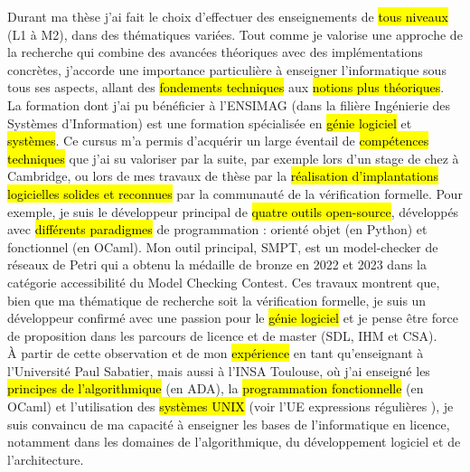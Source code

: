 \label{sec:projet_enseignement}
\vspace{10pt}

Durant ma thèse j'ai fait le choix d'effectuer des enseignements de \hl{tous
niveaux} (L1 à M2), dans des thématiques variées. Tout comme je valorise une
approche de la recherche qui combine des avancées théoriques avec des
implémentations concrètes, j'accorde une importance particulière à enseigner
l'informatique sous tous ses aspects, allant des \hl{fondements techniques} aux
\hl{notions plus théoriques}.\\

La formation dont j'ai pu bénéficier à l'ENSIMAG (dans la filière Ingénierie des
Systèmes d'Information) est une formation spécialisée en \hl{génie logiciel} et
\hl{systèmes}. Ce cursus m'a permis d'acquérir un large éventail de
\hl{compétences techniques} que j'ai su valoriser par la suite, par exemple lors
d'un stage de  chez  à Cambridge,
ou lors de mes travaux de thèse par la \hl{réalisation d'implantations
logicielles solides et reconnues} par la communauté de la vérification formelle.
Pour exemple, je suis le développeur principal de \hl{quatre outils
open-source}, développés avec \hl{différents paradigmes} de programmation :
orienté objet (en Python) et fonctionnel (en OCaml). Mon outil
principal, \textsf{SMPT}, est un model-checker de réseaux de Petri qui a obtenu
la médaille de bronze en 2022 et 2023 dans la catégorie \og accessibilité \fg du
Model Checking Contest. Ces travaux montrent que, bien que ma thématique de
recherche soit la vérification formelle, je suis un développeur confirmé avec
une passion pour le \hl{génie logiciel} et je pense être force de proposition
dans les parcours de licence et de master (SDL, IHM et CSA).\\

À partir de cette observation et de mon \hl{expérience} en tant qu'enseignant à
l'Université Paul Sabatier, mais aussi à l'INSA Toulouse, où j'ai enseigné les
\hl{principes de l'algorithmique} (en ADA), la \hl{programmation fonctionnelle}
(en OCaml) et l'utilisation des \hl{systèmes UNIX} (voir l'UE \og expressions
régulières \fg), je suis convaincu de ma capacité à enseigner les bases de
l'informatique en licence, notamment dans les domaines de l'algorithmique, du
développement logiciel et de l'architecture.\\

